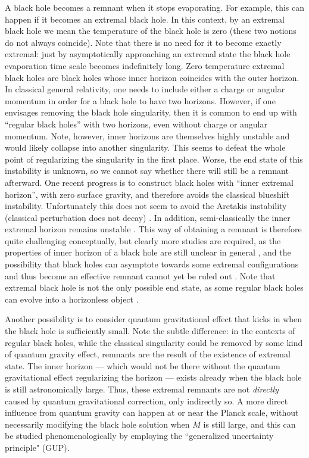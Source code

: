 \documentclass[12pt,preprintnumbers, floatfix, preprintnumbers, letterpaper, superscriptaddress,nofootinbib]{revtex4-2}
\begin{document}
A black hole becomes a remnant when it stops evaporating. For example, this can happen if it becomes an extremal black hole. 
In this context, by an extremal black hole we mean the temperature of the black hole is zero (these two notions do not always coincide). 
Note that there is no need for it to become exactly extremal: just by asymptotically approaching an extremal state the black hole evaporation time scale becomes indefinitely long.
Zero temperature extremal black holes are black holes whose inner horizon coincides with the outer horizon. In classical general relativity, one needs to include either a charge or angular momentum in order for a black hole to have two horizons. However, if one envisages removing the black hole singularity, then it is common to end up with ``regular black holes'' with two horizons, even without charge or angular momentum. Note, however, inner horizons are themselves highly unstable and would likely collapse into another singularity. This seems to defeat the whole point of regularizing the singularity in the first place. Worse, the end state of this instability is unknown, so we cannot say whether there will still be a remnant afterward. One recent progress is to construct black holes with ``inner extremal horizon'', with zero surface gravity, and therefore avoids the classical blueshift instability. Unfortunately this does not seem to avoid the Aretakis instability (classical perturbation does not decay) \cite{1206.6598,1208.1437,1212.2557,2112.09832}. In addition, semi-classically the inner extremal horizon remains unstable \cite{2303.03562}. This way of obtaining a remnant is therefore quite challenging conceptually, but clearly more studies are required, as the properties of inner horizon of a black hole are still unclear in general \cite{2308.09225}, and the possibility that black holes can asymptote towards some extremal configurations and thus become an effective remnant cannot yet be ruled out \cite{2405.08069}. Note that extremal black hole is not the only possible end state, as some regular black holes can evolve into a horizonless object \cite{2211.05817,2302.00028,2410.10582}. 

Another possibility is to consider quantum gravitational effect that kicks in when the black hole is sufficiently small. Note the subtle difference: in the contexts of regular black holes, while the classical singularity could be removed by some kind of quantum gravity effect, remnants are the result of the existence of extremal state. The inner horizon --- which would not be there without the quantum gravitational effect regularizing the horizon --- exists already when the black hole is still astronomically large. Thus, these extremal remnants are not \emph{directly} caused by quantum gravitational correction, only indirectly so. A more direct influence from quantum gravity can happen at or near the Planck scale, without necessarily modifying the black hole solution when $M$ is still large, and this can be studied phenomenologically by employing the ``generalized uncertainty principle" (GUP). 
\end{document}

